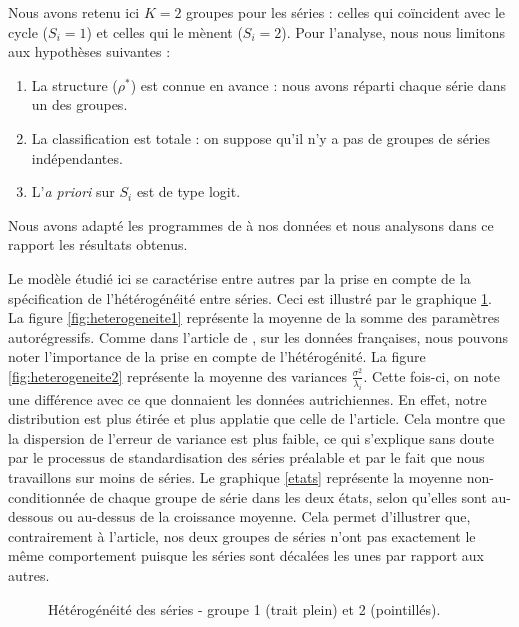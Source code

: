 \documentclass[10pt,french,french]{article}
\begin{document}
Nous avons retenu ici \(K=2\) groupes pour les séries : celles qui coïncident avec le cycle (\(S_i = 1\)) et celles qui le mènent (\(S_i = 2\)).
Pour l'analyse, nous nous limitons aux hypothèses suivantes :

\begin{enumerate}
\def\labelenumi{\arabic{enumi}.}
\item
  La structure (\(\rho^*\)) est connue en avance : nous avons réparti chaque série dans un des groupes.
\item
  La classification est totale : on suppose qu'il n'y a pas de groupes de séries indépendantes.
\item
  L'\emph{a priori} sur \(S_i\) est de type logit.
\end{enumerate}

Nous avons adapté les programmes de \cite{Kaufmann} à nos données et nous analysons dans ce rapport les résultats obtenus.

Le modèle étudié ici se caractérise entre autres par la prise en compte de la spécification de l'hétérogénéité entre séries.
Ceci est illustré par le graphique \ref{heterogeneite}.
La figure \ref{fig:heterogeneite1} représente la moyenne de la somme des paramètres autorégressifs.
Comme dans l'article de \cite{Kaufmann}, sur les données françaises, nous pouvons noter l'importance de la prise en compte de l'hétérogénité.
La figure \ref{fig:heterogeneite2} représente la moyenne des variances \(\frac{\sigma^2}{\lambda_i}\).
Cette fois-ci, on note une différence avec ce que donnaient les données autrichiennes.
En effet, notre distribution est plus étirée et plus applatie que celle de l'article.
Cela montre que la dispersion de l'erreur de variance est plus faible, ce qui s'explique sans doute par le processus de standardisation des séries préalable et par le fait que nous travaillons sur moins de séries.
Le graphique \ref{etats} représente la moyenne non-conditionnée de chaque groupe de série dans les deux états, selon qu'elles sont au-dessous ou au-dessus de la croissance moyenne.
Cela permet d'illustrer que, contrairement à l'article, nos deux groupes de séries n'ont pas exactement le même comportement puisque les séries sont décalées les unes par rapport aux autres.

\begin{figure}[htb]
\caption{Hétérogénéité des séries - groupe 1 (trait plein) et 2 (pointillés).}
\label{heterogeneite}
\end{figure}
\end{document}
